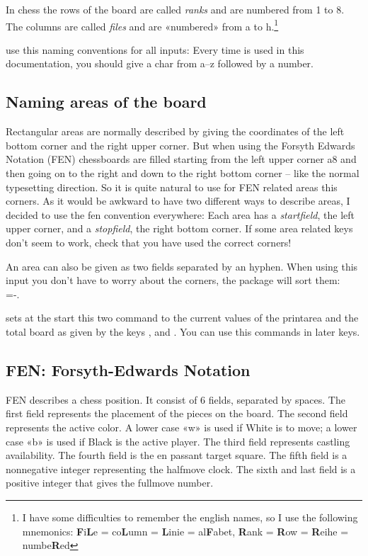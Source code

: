 \documentclass[pagesize,parskip=half-,fontsize=12pt]{scrartcl}
\begin{document}
In chess the rows of the board are called \emph{ranks} and are
numbered from 1 to 8. The columns are called \emph{files} and are
«numbered» from a to h.\footnote{%
I have some difficulties to remember the english names, so I use the
following mnemonics:
\textbf{F}i\textbf{L}e = co\textbf{L}umn = \textbf{L}inie =
al\textbf{F}abet,
\textbf{R}ank = \textbf{R}ow = \textbf{R}eihe = numbe\textbf{R}ed}

\Pchessboard use this naming conventions for all inputs:
Every time  is used in this documentation, you should
give a char from a--z followed by a number.


\subsection{Naming areas of the board}

Rectangular areas are normally described by giving the coordinates
of the left bottom corner and the right upper corner. But when using
the Forsyth Edwards Notation (FEN) chessboards are filled starting
from the left upper corner a8 and then going on to the right and
down to the right bottom corner -- like the normal typesetting
direction. So it is quite natural to use for FEN related areas this
corners. As it would be awkward to have two different ways to
describe areas, I decided to use the fen convention everywhere: Each
area has a
\emph{startfield}, the left upper corner, and a \emph{stopfield},
the right bottom corner. If some area related keys  don't seem to
work, check that you have used the correct corners!


An area can also be given as two fields separated by an hyphen. When
using this input you don't have to worry about the corners, the
package will sort them:\\
=-.


\DescribeMacro{\printarea} \DescribeMacro{\board} 
sets at the start this two command to the current values of the
printarea and the total board as given by the keys ,
 and . You can use this commands in
later keys.


\subsection{FEN: Forsyth-Edwards Notation}\label{sec:FEN}

FEN describes a chess position. It consist of 6 fields, separated by
spaces. The first field represents the placement of the pieces on
the board. The second field represents the active color.  A lower
case «w» is used if White is to move; a lower case «b» is used if
Black is the active player. The third field represents castling
availability. The fourth field is the en passant target square. The
fifth field is a nonnegative integer representing the halfmove
clock. The sixth and last field is a positive integer that gives the
fullmove number.
\end{document}
